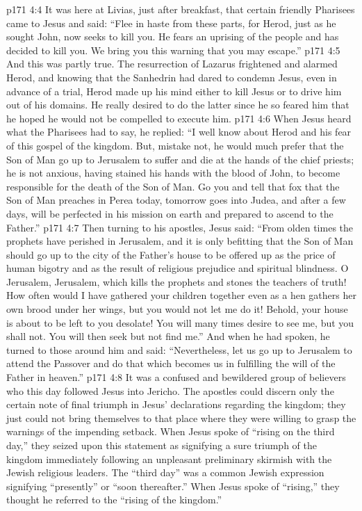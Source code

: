 \pc \vs p171 4:4 It was here at Livias, just after breakfast, that certain friendly Pharisees came to Jesus and said: “Flee in haste from these parts, for Herod, just as he sought John, now seeks to kill you. He fears an uprising of the people and has decided to kill you. We bring you this warning that you may escape.”
\vs p171 4:5 And this was partly true. The resurrection of Lazarus frightened and alarmed Herod, and knowing that the Sanhedrin had dared to condemn Jesus, even in advance of a trial, Herod made up his mind either to kill Jesus or to drive him out of his domains. He really desired to do the latter since he so feared him that he hoped he would not be compelled to execute him.
\vs p171 4:6 When Jesus heard what the Pharisees had to say, he replied: \textcolor{ubdarkred}{“I well know about Herod and his fear of this gospel of the kingdom. But, mistake not, he would much prefer that the Son of Man go up to Jerusalem to suffer and die at the hands of the chief priests; he is not anxious, having stained his hands with the blood of John, to become responsible for the death of the Son of Man. Go you and tell that fox that the Son of Man preaches in Perea today, tomorrow goes into Judea, and after a few days, will be perfected in his mission on earth and prepared to ascend to the Father.”}
\vs p171 4:7 Then turning to his apostles, Jesus said: \textcolor{ubdarkred}{“From olden times the prophets have perished in Jerusalem, and it is only befitting that the Son of Man should go up to the city of the Father’s house to be offered up as the price of human bigotry and as the result of religious prejudice and spiritual blindness. O Jerusalem, Jerusalem, which kills the prophets and stones the teachers of truth! How often would I have gathered your children together even as a hen gathers her own brood under her wings, but you would not let me do it! Behold, your house is about to be left to you desolate! You will many times desire to see me, but you shall not. You will then seek but not find me.”} And when he had spoken, he turned to those around him and said: \textcolor{ubdarkred}{“Nevertheless, let us go up to Jerusalem to attend the Passover and do that which becomes us in fulfilling the will of the Father in heaven.”}\plusone
\pc \vs p171 4:8 It was a confused and bewildered group of believers who this day followed Jesus into Jericho. The apostles could discern only the certain note of final triumph in Jesus’ declarations regarding the kingdom; they just could not bring themselves to that place where they were willing to grasp the warnings of the impending setback. When Jesus spoke of \textcolor{ubdarkred}{“rising on the third day,”} they seized upon this statement as signifying a sure triumph of the kingdom immediately following an unpleasant preliminary skirmish with the Jewish religious leaders. The “third day” was a common Jewish expression signifying “presently” or “soon thereafter.” When Jesus spoke of \textcolor{ubdarkred}{“rising,”} they thought he referred to the “rising of the kingdom.”
